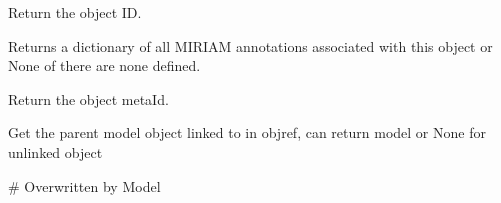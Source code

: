 \documentclass[letterpaper,10pt,english]{sphinxmanual}
\begin{document}
\begin{fulllineitems}

\begin{fulllineitems}
\label{\detokenize{modules_doc:cbmpy.CBModel.Fbase.getId}}
\pysigstartsignatures
{}
\pysigstopsignatures
\sphinxAtStartPar
Return the object ID.

\end{fulllineitems}


\begin{fulllineitems}
\label{\detokenize{modules_doc:cbmpy.CBModel.Fbase.getMIRIAMannotations}}
\pysigstartsignatures
{}
\pysigstopsignatures
\sphinxAtStartPar
Returns a dictionary of all MIRIAM annotations associated with this object
or None of there are none defined.

\end{fulllineitems}


\begin{fulllineitems}
\label{\detokenize{modules_doc:cbmpy.CBModel.Fbase.getMetaId}}
\pysigstartsignatures
{}
\pysigstopsignatures
\sphinxAtStartPar
Return the object metaId.

\end{fulllineitems}


\begin{fulllineitems}
\label{\detokenize{modules_doc:cbmpy.CBModel.Fbase.getModel}}
\pysigstartsignatures
{}
\pysigstopsignatures
\sphinxAtStartPar
Get the parent model object linked to in objref, can return model or None for unlinked object

\sphinxAtStartPar
\# Overwritten by Model

\end{fulllineitems}



\end{fulllineitems}
\end{document}
